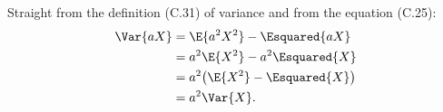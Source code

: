 Straight from the definition (C.31) of variance and from the equation (C.25):
\begin{align*}
    \Var{aX} &= \E{a^2X^2}-\Esquared{aX} \\
    &= a^2\E{X^2}-a^2\Esquared{X} \\
    &= a^2\!\left(\E{X^2}-\Esquared{X}\right) \\
    &= a^2\Var{X}.
\end{align*}
